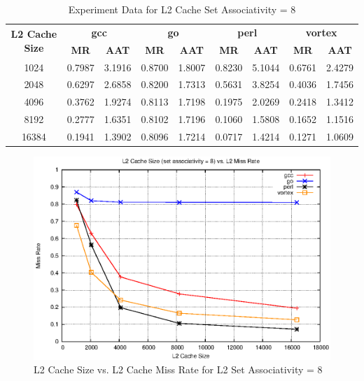\documentclass[a4paper]{article}
\begin{document}
\begin{table}[htbp]
    \centering
    \begin{tabular}{|c|c|c|c|c|c|c|c|c|}
        \hline
        \multirow{2}[4]{*}{\bf L2 Cache Size} & \multicolumn{2}{c|}{\bf gcc} & \multicolumn{2}{c|}{\bf go} & \multicolumn{2}{c|}{\bf perl}          &\multicolumn{2}{c|}{\bf vortex}\\
        \cline{2-9} & \bf MR & \bf AAT & \bf MR & \bf AAT & \bf MR & \bf AAT & \bf MR & \bf AAT \\
        \hline
        1024 & 0.7987 & 3.1916 & 0.8700 & 1.8007 & 0.8230 & 5.1044 & 0.6761 & 2.4279 \\
        2048 & 0.6297 & 2.6858 & 0.8200 & 1.7313 & 0.5631 & 3.8254 & 0.4036 & 1.7456 \\
        4096 & 0.3762 & 1.9274 & 0.8113 & 1.7198 & 0.1975 & 2.0269 & 0.2418 & 1.3412 \\
        8192 & 0.2777 & 1.6351 & 0.8102 & 1.7196 & 0.1060 & 1.5808 & 0.1652	& 1.1516 \\
        16384 & 0.1941 & 1.3902 & 0.8096 & 1.7214 & 0.0717 & 1.4214 & 0.1271 & 1.0609 \\
        \hline
    \end{tabular}
    \captionsetup{justification=centering}
    \caption{Experiment Data for L2 Cache Set Associativity = 8}
    \label{tab:l2mr_data_sa8}
\end{table}

\begin{figure}
    \centering
    \includegraphics[width=\textwidth] {l2_sa_8.eps}
    \captionsetup{justification=centering}
    \caption{L2 Cache Size vs. L2 Cache Miss Rate for L2 Set Associativity = 8}
    \label{fig:l2mr_graph_sa8}
\end{figure}
\end{document}
